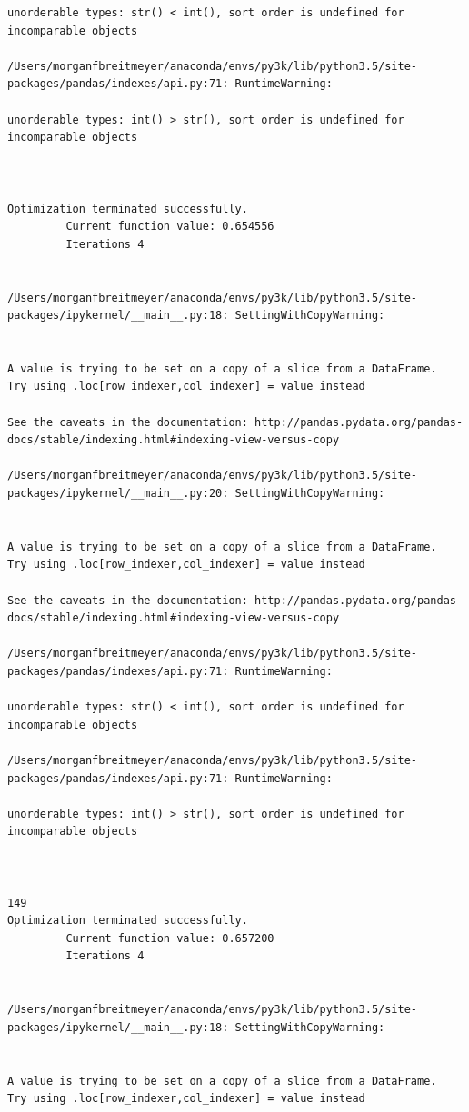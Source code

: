 \begin{lstlisting}
unorderable types: str() < int(), sort order is undefined for incomparable objects

/Users/morganfbreitmeyer/anaconda/envs/py3k/lib/python3.5/site-packages/pandas/indexes/api.py:71: RuntimeWarning:

unorderable types: int() > str(), sort order is undefined for incomparable objects



Optimization terminated successfully.
         Current function value: 0.654556
         Iterations 4


/Users/morganfbreitmeyer/anaconda/envs/py3k/lib/python3.5/site-packages/ipykernel/__main__.py:18: SettingWithCopyWarning:


A value is trying to be set on a copy of a slice from a DataFrame.
Try using .loc[row_indexer,col_indexer] = value instead

See the caveats in the documentation: http://pandas.pydata.org/pandas-docs/stable/indexing.html#indexing-view-versus-copy

/Users/morganfbreitmeyer/anaconda/envs/py3k/lib/python3.5/site-packages/ipykernel/__main__.py:20: SettingWithCopyWarning:


A value is trying to be set on a copy of a slice from a DataFrame.
Try using .loc[row_indexer,col_indexer] = value instead

See the caveats in the documentation: http://pandas.pydata.org/pandas-docs/stable/indexing.html#indexing-view-versus-copy

/Users/morganfbreitmeyer/anaconda/envs/py3k/lib/python3.5/site-packages/pandas/indexes/api.py:71: RuntimeWarning:

unorderable types: str() < int(), sort order is undefined for incomparable objects

/Users/morganfbreitmeyer/anaconda/envs/py3k/lib/python3.5/site-packages/pandas/indexes/api.py:71: RuntimeWarning:

unorderable types: int() > str(), sort order is undefined for incomparable objects



149
Optimization terminated successfully.
         Current function value: 0.657200
         Iterations 4


/Users/morganfbreitmeyer/anaconda/envs/py3k/lib/python3.5/site-packages/ipykernel/__main__.py:18: SettingWithCopyWarning:


A value is trying to be set on a copy of a slice from a DataFrame.
Try using .loc[row_indexer,col_indexer] = value instead


\end{lstlisting}
